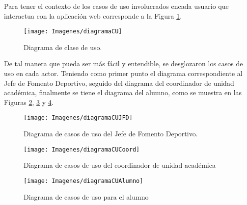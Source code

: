 	\noindent Para tener el contexto de los casos de uso involucrados encada usuario que interactua con la aplicación web corresponde a la Figura \ref{diagramaCU}.
	\begin{figure}[hbt!]
		\centering
		\texttt{[image: Imagenes/diagramaCU]}
		\caption{Diagrama de clase de uso.}
		\label{diagramaCU}
	\end{figure}

	\noindent De tal manera que pueda ser más fácil y entendible, se desglozaron los casos de uso en cada actor. Teniendo como primer punto el diagrama correspondiente al Jefe de Fomento Deportivo, seguido del diagrama del coordinador de unidad académica, finalmente se tiene el diagrama del alumno, como se muestra en las Figuras \ref{diagramacujfd}, \ref{diagramacucoord} y \ref{diagramacualumno}.
	
	\begin{figure} [hbt!]
		\centering
		\texttt{[image: Imagenes/diagramaCUJFD]}
		\caption{Diagrama de casos de uso del Jefe de Fomento Deportivo.}
		\label{diagramacujfd}
	\end{figure}
\pagebreak
	
	\begin{figure}[hbt!]
		\centering
		\texttt{[image: Imagenes/diagramaCUCoord]}
		\caption{Diagrama de casos de uso del coordinador de unidad académica}
		\label{diagramacucoord}
	\end{figure}

	\begin{figure} [hbt!]
		\centering
		\texttt{[image: Imagenes/diagramaCUAlumno]}
		\caption{Diagrama de casos de uso para el alumno}
		\label{diagramacualumno}
	\end{figure}
	
	
	

